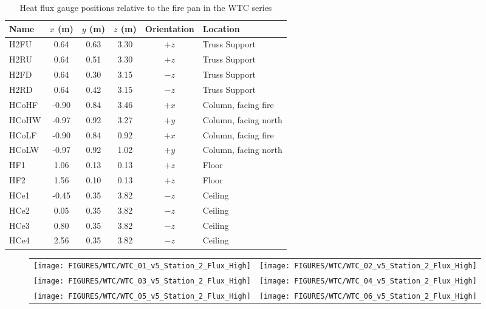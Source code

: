 \begin{table}[h!]
\caption{Heat flux gauge positions relative to the fire pan in the WTC series}
\vspace{\baselineskip}
\begin{center}
\begin{tabular}{|l|c|c|c|c|l|}
\hline
Name    & $x$ (m)   & $y$ (m) & $z$ (m)   & Orientation  & Location  \\ \hline \hline
H2FU    & 0.64      & 0.63    & 3.30      &     $+z$     & Truss Support         \\ \hline
H2RU    & 0.64      & 0.51    & 3.30      &     $+z$     & Truss Support          \\ \hline
H2FD    & 0.64      & 0.30    & 3.15      &     $-z$     & Truss Support          \\ \hline
H2RD    & 0.64      & 0.42    & 3.15      &     $-z$     & Truss Support          \\ \hline
HCoHF   & -0.90     & 0.84    & 3.46      &     $+x$     & Column, facing fire          \\ \hline
HCoHW   & -0.97     & 0.92    & 3.27      &     $+y$     & Column, facing north          \\ \hline
HCoLF   & -0.90     & 0.84    & 0.92      &     $+x$     & Column, facing fire          \\ \hline
HCoLW   & -0.97     & 0.92    & 1.02      &     $+y$     & Column, facing north          \\ \hline
HF1     & 1.06      & 0.13    & 0.13      &     $+z$     & Floor          \\ \hline
HF2     & 1.56      & 0.10    & 0.13      &     $+z$     & Floor          \\ \hline
HCe1    & -0.45     & 0.35    & 3.82      &     $-z$     & Ceiling          \\ \hline
HCe2    &  0.05     & 0.35    & 3.82      &     $-z$     & Ceiling          \\ \hline
HCe3    &  0.80     & 0.35    & 3.82      &     $-z$     & Ceiling          \\ \hline
HCe4    &  2.56     & 0.35    & 3.82      &     $-z$     & Ceiling          \\ \hline
\end{tabular}
\end{center}
\label{WTC_Gauges}
\end{table}

\begin{figure}[p]
\begin{tabular*}{\textwidth}{l@{\extracolsep{\fill}}r}
\texttt{[image: FIGURES/WTC/WTC\_01\_v5\_Station\_2\_Flux\_High]} &
\texttt{[image: FIGURES/WTC/WTC\_02\_v5\_Station\_2\_Flux\_High]} \\
\texttt{[image: FIGURES/WTC/WTC\_03\_v5\_Station\_2\_Flux\_High]} &
\texttt{[image: FIGURES/WTC/WTC\_04\_v5\_Station\_2\_Flux\_High]} \\
\texttt{[image: FIGURES/WTC/WTC\_05\_v5\_Station\_2\_Flux\_High]} &
\texttt{[image: FIGURES/WTC/WTC\_06\_v5\_Station\_2\_Flux\_High]}
\end{tabular*}
\label{NIST_WTC_Station_2_Flux_High}
\end{figure}

